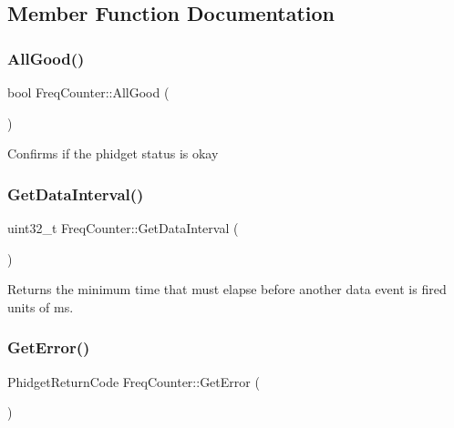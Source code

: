 \subsection{Member Function Documentation}
\mbox{\label{classFreqCounter_a49d710c33596f4041ecc46883dfc6d5a}} 
\subsubsection{\texorpdfstring{All\+Good()}{AllGood()}}
{\footnotesize\ttfamily bool Freq\+Counter\+::\+All\+Good (\begin{DoxyParamCaption}{ }\end{DoxyParamCaption})\hspace{0.3cm}{\ttfamily [inline]}}

Confirms if the phidget status is okay\mbox{\label{classFreqCounter_aab820d1ad9c18aa299667610aba8647e}} 
\subsubsection{\texorpdfstring{Get\+Data\+Interval()}{GetDataInterval()}}
{\footnotesize\ttfamily uint32\+\_\+t Freq\+Counter\+::\+Get\+Data\+Interval (\begin{DoxyParamCaption}{ }\end{DoxyParamCaption})\hspace{0.3cm}{\ttfamily [inline]}}

Returns the minimum time that must elapse before another data event is fired units of ms.\mbox{\label{classFreqCounter_a2ede581f4092d38deaf64955380ec77a}} 
\subsubsection{\texorpdfstring{Get\+Error()}{GetError()}}
{\footnotesize\ttfamily Phidget\+Return\+Code Freq\+Counter\+::\+Get\+Error (\begin{DoxyParamCaption}{ }\end{DoxyParamCaption})\hspace{0.3cm}{\ttfamily [inline]}}

